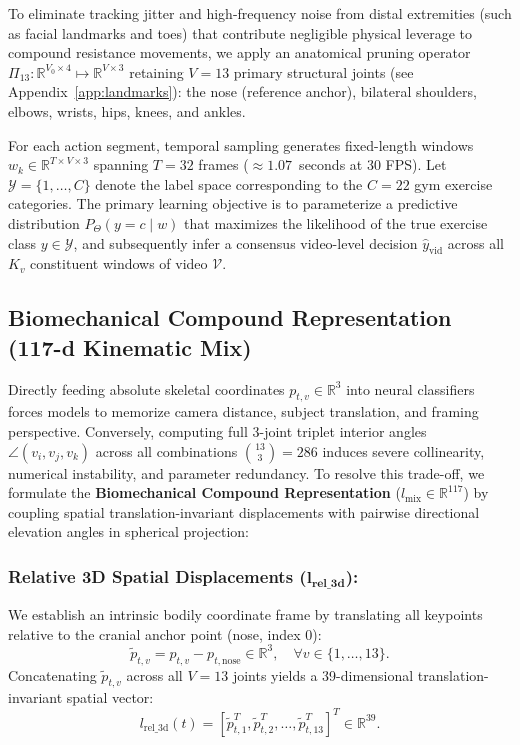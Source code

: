 \documentclass[preprint,12pt]{elsarticle}
\begin{document}
To eliminate tracking jitter and high-frequency noise from distal extremities (such as facial landmarks and toes) that contribute negligible physical leverage to compound resistance movements, we apply an anatomical pruning operator $\Pi_{13}: \mathbb{R}^{V_0 \times 4} \mapsto \mathbb{R}^{V \times 3}$ retaining $V = 13$ primary structural joints (see Appendix~\ref{app:landmarks}): the nose (reference anchor), bilateral shoulders, elbows, wrists, hips, knees, and ankles.

For each action segment, temporal sampling generates fixed-length windows $w_k \in \mathbb{R}^{T \times V \times 3}$ spanning $T = 32$ frames ($\approx 1.07$~seconds at 30 FPS). Let $\mathcal{Y} = \{1, \dots, C\}$ denote the label space corresponding to the $C = 22$ gym exercise categories. The primary learning objective is to parameterize a predictive distribution $P_\Theta(y = c \mid w)$ that maximizes the likelihood of the true exercise class $y \in \mathcal{Y}$, and subsequently infer a consensus video-level decision $\hat{y}_{\text{vid}}$ across all $K_v$ constituent windows of video $\mathcal{V}$.

\subsection{Biomechanical Compound Representation (117-d Kinematic Mix)}
Directly feeding absolute skeletal coordinates $p_{t, v} \in \mathbb{R}^3$ into neural classifiers forces models to memorize camera distance, subject translation, and framing perspective. Conversely, computing full 3-joint triplet interior angles $\angle(v_i, v_j, v_k)$ across all combinations $\binom{13}{3} = 286$ induces severe collinearity, numerical instability, and parameter redundancy. To resolve this trade-off, we formulate the \textbf{Biomechanical Compound Representation} ($l_{\text{mix}} \in \mathbb{R}^{117}$) by coupling spatial translation-invariant displacements with pairwise directional elevation angles in spherical projection:

\subsubsection{Relative 3D Spatial Displacements ($\mathbf{l_{\text{rel\_3d}}}$):}
We establish an intrinsic bodily coordinate frame by translating all keypoints relative to the cranial anchor point (nose, index 0):
\begin{equation}
    \tilde{p}_{t, v} = p_{t, v} - p_{t, \text{nose}} \in \mathbb{R}^3, \quad \forall v \in \{1, \dots, 13\}.
\end{equation}
Concatenating $\tilde{p}_{t, v}$ across all $V=13$ joints yields a 39-dimensional translation-invariant spatial vector:
\begin{equation}
    l_{\text{rel\_3d}}(t) = \left[ \tilde{p}_{t, 1}^T, \tilde{p}_{t, 2}^T, \dots, \tilde{p}_{t, 13}^T \right]^T \in \mathbb{R}^{39}.
\end{equation}
\end{document}
